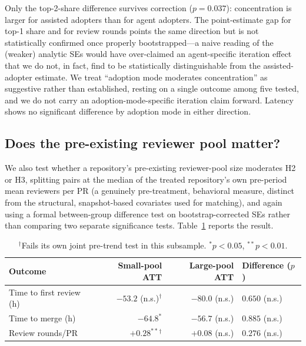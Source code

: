 \documentclass[12pt]{article}
\begin{document}
Only the top-2-share difference survives correction ($p=0.037$):
concentration is larger for assisted adopters than for agent adopters.
The point-estimate gap for top-1 share and for review rounds points the
same direction but is not statistically confirmed once properly
bootstrapped---a naive reading of the (weaker) analytic SEs would have
over-claimed an agent-specific iteration effect that we do not, in fact,
find to be statistically distinguishable from the assisted-adopter
estimate. We treat ``adoption mode moderates concentration'' as
suggestive rather than established, resting on a single outcome among
five tested, and we do not carry an adoption-mode-specific iteration
claim forward. Latency shows no significant difference by adoption mode
in either direction.

\subsection{Does the pre-existing reviewer pool matter?}
\label{sec:heterogeneity}

We also test whether a repository's pre-existing reviewer-pool size
moderates H2 or H3, splitting pairs at the median of the treated
repository's own pre-period mean reviewers per PR (a genuinely
pre-treatment, behavioral measure, distinct from the structural,
snapshot-based covariates used for matching), and again using a formal
between-group difference test on bootstrap-corrected SEs rather than
comparing two separate significance tests. Table~\ref{tab:heterogeneity}
reports the result.

\begin{table}[htbp]
\centering
\caption{Reviewer-pool heterogeneity: small vs.\ large pre-existing pool}
\label{tab:heterogeneity}
\small
\begin{tabular}{lrrl}
\toprule
Outcome & Small-pool ATT & Large-pool ATT & Difference ($p$) \\
\midrule
Time to first review (h) & $-53.2$ (n.s.)$^{\dagger}$ & $-80.0$ (n.s.) & $0.650$ (n.s.) \\
Time to merge (h)        & $-64.8^{*}$                & $-56.7$ (n.s.) & $0.885$ (n.s.) \\
Review rounds/PR         & $+0.28^{**}$$^{\dagger}$    & $+0.08$ (n.s.) & $0.276$ (n.s.) \\
\bottomrule
\end{tabular}
\caption*{\footnotesize $^{\dagger}$Fails its own joint pre-trend test in
this subsample. $^{*}p<0.05$, $^{**}p<0.01$.}
\end{table}
\end{document}
